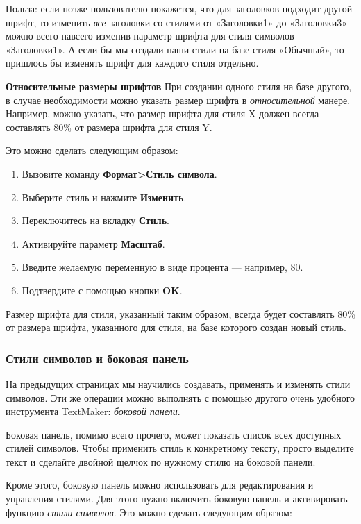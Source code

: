 \documentclass[a4paper,10pt]{article}
\begin{document}
Польза: если позже пользователю покажется, что для заголовков подходит другой шрифт, то изменить \textit{все} заголовки со стилями от «Заголовки1» до «Заголовки3» можно всего-навсего изменив параметр шрифта для стиля символов «Заголовки1». А если бы мы создали наши стили на базе стиля «Обычный», то пришлось бы изменять шрифт для каждого стиля отдельно.

\textbf{Относительные размеры шрифтов}
При создании одного стиля на базе другого, в случае необходимости можно указать размер шрифта в \textit{относительной} манере. Например, можно указать, что размер шрифта для стиля X должен всегда составлять 80\% от размера шрифта для стиля Y.

Это можно сделать следующим образом:
\begin{enumerate}
 \item Вызовите команду \textbf{Формат>Стиль символа}.
 \item Выберите стиль и нажмите \textbf{Изменить}.
 \item Переключитесь на вкладку \textbf{Стиль}.
 \item Активируйте параметр \textbf{Масштаб}.
 \item Введите желаемую переменную в виде процента --- например, 80.
 \item Подтвердите с помощью кнопки \textbf{OK}.
\end{enumerate}

Размер шрифта для стиля, указанный таким образом, всегда будет составлять 80\% от размера шрифта, указанного для стиля, на базе которого создан новый стиль.

\subsubsection{Стили символов и боковая панель}
На предыдущих страницах мы научились создавать, применять и изменять стили символов. Эти же операции можно выполнять с помощью другого очень удобного инструмента TextMaker: \textit{боковой панели}.

Боковая панель, помимо всего прочего, может показать список всех доступных стилей символов. Чтобы применить стиль к конкретному тексту, просто выделите текст и сделайте двойной щелчок по нужному стилю на боковой панели.

Кроме этого, боковую панель можно использовать для редактирования и управления стилями. Для этого нужно включить боковую панель и активировать функцию \textit{стили символов}. Это можно сделать следующим образом:
\end{document}
